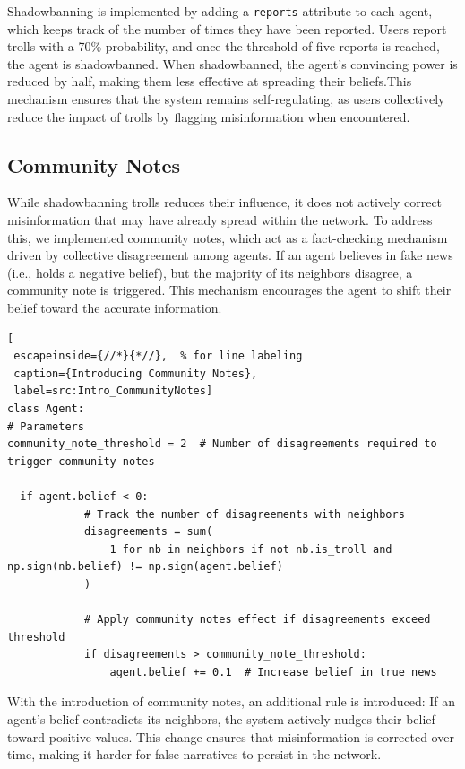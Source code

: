 \documentclass[a4paper,11pt]{scrartcl}
\begin{document}
Shadowbanning is implemented by adding a \verb|reports| attribute to each agent, which keeps track of the number of times they have been reported. Users report trolls with a 70\% probability, and once the threshold of five reports is reached, the agent is shadowbanned. When shadowbanned, the agent's convincing power is reduced by half, making them less effective at spreading their beliefs.This mechanism ensures that the system remains self-regulating, as users collectively reduce the impact of trolls by flagging misinformation when encountered.

\subsection{Community Notes}
While shadowbanning trolls reduces their influence, it does not actively correct misinformation that may have already spread within the network. To address this, we implemented community notes, which act as a fact-checking mechanism driven by collective disagreement among agents. If an agent believes in fake news (i.e., holds a negative belief), but the majority of its neighbors disagree, a community note is triggered. This mechanism encourages the agent to shift their belief toward the accurate information.

\begin{lstlisting}[
 escapeinside={//*}{*//},  % for line labeling
 caption={Introducing Community Notes},
 label=src:Intro_CommunityNotes]
class Agent:
# Parameters
community_note_threshold = 2  # Number of disagreements required to trigger community notes

  if agent.belief < 0:
            # Track the number of disagreements with neighbors
            disagreements = sum(
                1 for nb in neighbors if not nb.is_troll and np.sign(nb.belief) != np.sign(agent.belief)
            )

            # Apply community notes effect if disagreements exceed threshold
            if disagreements > community_note_threshold:
                agent.belief += 0.1  # Increase belief in true news
\end{lstlisting}  

With the introduction of community notes, an additional rule is introduced: If an agent's belief contradicts its neighbors, the system actively nudges their belief toward positive values. This change ensures that misinformation is corrected over time, making it harder for false narratives to persist in the network.
\end{document}
